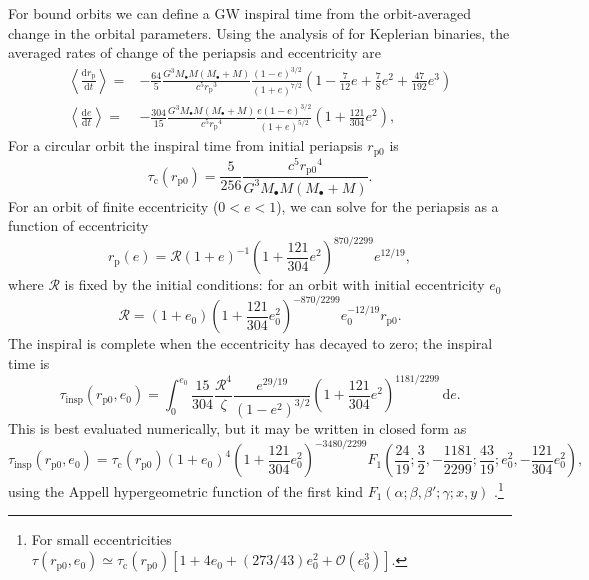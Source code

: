 \documentclass[useAMS,usedcolumn,usegraphicx,usenatbib]{mn2e}
\newcommand{\sub}[1]{\ensuremath{_\mathrm{#1}}}
\newcommand{\dd}{\ensuremath{\mathrm{d}}}
\newcommand{\diff}[2]{\ensuremath{\frac{\dd {#1}}{\dd {#2}}}}
\newcommand{\intd}[4]{\ensuremath{\displaystyle \int_{#1}^{#2}{#3}\,\dd{#4}}}
\newcommand{\order}[1]{\ensuremath{\mathcal{O}({#1})}}
\begin{document}
\begin{onecolumn}
For bound orbits we can define a GW inspiral time from the orbit-averaged change in the orbital parameters. Using the analysis of \citet{Peters1964} for Keplerian binaries, the averaged rates of change of the periapsis and eccentricity are
\begin{align}
\left\langle\diff{r\sub{p}}{t}\right\rangle = {} & -\frac{64}{5}\frac{G^3M_\bullet M(M_\bullet + M)}{c^5r\sub{p}^3}\frac{(1 - e)^{3/2}}{(1 + e)^{7/2}}\left(1 - \frac{7}{12}e + \frac{7}{8}e^2 + \frac{47}{192}e^3\right) \\
\left\langle\diff{e}{t}\right\rangle = {} & -\frac{304}{15}\frac{G^3M_\bullet M(M_\bullet + M)}{c^5r\sub{p}^4}\frac{e(1 - e)^{3/2}}{(1 + e)^{5/2}}\left(1 + \frac{121}{304}e^2\right),
\end{align}
For a circular orbit the inspiral time from initial periapsis $r\sub{p0}$ is
\begin{equation}
\tau\sub{c}(r\sub{p0}) = \frac{5}{256}\frac{c^5r\sub{p0}^4}{G^3M_\bullet M(M_\bullet + M)}.
\end{equation}
For an orbit of finite eccentricity ($0 < e < 1$), we can solve for the periapsis as a function of eccentricity
\begin{equation}
r\sub{p}(e) = \mathcal{R}(1 + e)^{-1}\left(1 + \frac{121}{304}e^2\right)^{870/2299}e^{12/19},
\end{equation}
where $\mathcal{R}$ is fixed by the initial conditions: for an orbit with initial eccentricity $e_0$
\begin{equation}
\mathcal{R} = (1 + e_0)\left(1 + \frac{121}{304}e_0^2\right)^{-870/2299}e_0^{-12/19}r\sub{p0}.
\end{equation}
The inspiral is complete when the eccentricity has decayed to zero; the inspiral time is \citep{Peters1964}
\begin{equation}
\tau\sub{insp}(r\sub{p0},e_0) = \intd{0}{e_0}{\frac{15}{304}\frac{\mathcal{R}^4}{\zeta}\frac{e^{29/19}}{(1-e^2)^{3/2}}\left(1 + \frac{121}{304}e^2\right)^{1181/2299}}{e}.
\end{equation}
This is best evaluated numerically, but it may be written in closed form as
\begin{equation}
\tau\sub{insp}(r\sub{p0},e_0) = \tau\sub{c}(r\sub{p0})(1 + e_0)^4\left(1 + \frac{121}{304}e_0^2\right)^{-3480/2299} F_1\left(\frac{24}{19};\frac{3}{2},-\frac{1181}{2299};\frac{43}{19};e_0^2,-\frac{121}{304}e_0^2\right),
\label{eq:Bound_inspiral}
\end{equation}
using the Appell hypergeometric function of the first kind $F_1(\alpha;\beta,\beta';\gamma;x,y)$ \citep[16.15.1]{Olver2010}.\footnote{For small eccentricities $\tau(r\sub{p0},e_0) \simeq \tau\sub{c}(r\sub{p0})[1 + 4e_0 + (273/43)e_0^2 + \order{e_0^3}]$.}


\end{onecolumn}
\end{document}
